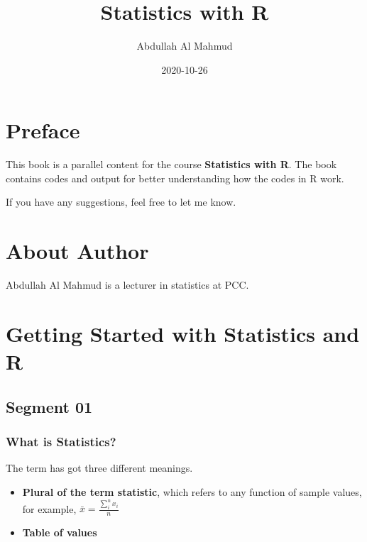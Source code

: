 \documentclass[
]{book}
\title{Statistics with R}
\author{Abdullah Al Mahmud}
\date{2020-10-26}
\providecommand{\tightlist}{%
  \setlength{\itemsep}{0pt}\setlength{\parskip}{0pt}}
\begin{document}
\maketitle

{
\setcounter{tocdepth}{1}
\tableofcontents
}
\hypertarget{preface}{%
\chapter*{Preface}\label{preface}}

This book is a parallel content for the course \textbf{Statistics with R}. The book contains codes and output for better understanding how the codes in R work.

If you have any suggestions, feel free to let me know.

\hypertarget{about-author}{%
\chapter*{About Author}\label{about-author}}

Abdullah Al Mahmud is a lecturer in statistics at PCC.

\hypertarget{start}{%
\chapter{Getting Started with Statistics and R}\label{start}}

\hypertarget{segment-01}{%
\section{Segment 01}\label{segment-01}}

\hypertarget{what-is-statistics}{%
\subsection{What is Statistics?}\label{what-is-statistics}}

The term has got three different meanings.

\begin{itemize}
\tightlist
\item
  \textbf{Plural of the term statistic}, which refers to any function of sample values, for example, \(\bar x = \frac {\sum_i^n x_i} n\)
\item
  \textbf{Table of values}
\end{itemize}
\end{document}
